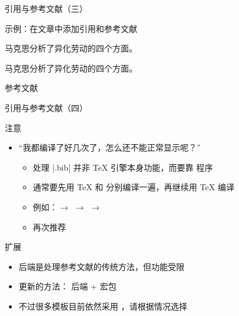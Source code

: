 \begin{frame}[fragile]{引用与参考文献（三）}
  \begin{exampleblock}{示例：在文章中添加引用和参考文献}
    \begin{texcode}[gobble=6]
      马克思分析了异化劳动的四个方面。\cite{1844_marx_manuscripts}

      
    \end{texcode}
    \vspace{1em}
    \hspace{2em}马克思分析了异化劳动的四个方面。\cite{1844_marx_manuscripts}
    \begin{center}
       \textsf{参考文献}
    \end{center}
    \renewcommand{\bibsection}{}
    
  \end{exampleblock}
\end{frame}

\begin{frame}[fragile]{引用与参考文献（四）}
  \begin{alertblock}{注意}
    \begin{itemize}
      \item “我都编译了好几次了，怎么还不能正常显示呢？”
            \begin{itemize}
              \item 处理 |.bib| 并非 \TeX{} 引擎本身功能，而要靠 \BibTeX 程序
              \item 通常要先用 \TeX{} 和 \BibTeX 分别编译一遍，再继续用 \TeX{} 编译
              \item 例如：\XeLaTeX $\rightarrow$ \BibTeX $\rightarrow$ \XeLaTeX $\rightarrow$ \XeLaTeX
              \item 再次推荐 
            \end{itemize}
    \end{itemize}
  \end{alertblock}
  \vspace{-1em}
  \begin{block}{扩展}
    \begin{itemize}
      \item \BibTeX 后端是处理参考文献的传统方法，但功能受限
      \item 更新的方法： 后端 +  宏包
      \item 不过很多模板目前依然采用 \BibTeX，请根据情况选择
    \end{itemize}
  \end{block}
\end{frame}

